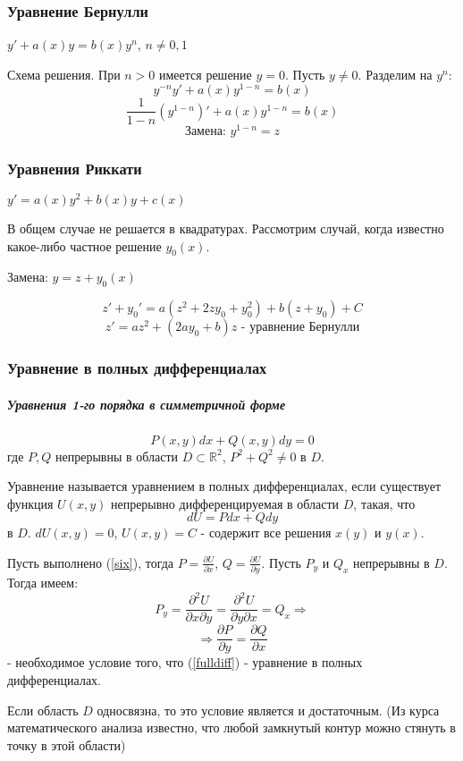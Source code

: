   \subsubsection{Уравнение Бернулли}
  $ \boxed{y' + a(x)y = b(x) y^n} $, $n \neq 0, 1 $
  
  \noindent Схема решения.  
  При $n > 0$ имеется решение $y = 0$.
  Пусть $y \neq 0$. Разделим на $y^n$:
  $$ y^{-n}y' + a(x)y^{1 - n} = b(x) $$
  $$ \frac{1}{1 - n}(y^{1-n})' + a(x)y^{1 - n} = b(x) $$
  $$ \text{Замена: } y^{1 -n} = z $$
  
  \subsubsection{Уравнения Риккати}
  $ \boxed{y' = a(x)y^2 + b(x) y + c(x)} $ 
  
  \noindent В общем случае не решается в квадратурах. Рассмотрим случай, когда известно какое-либо частное решение $y_0(x)$. 
  
  \noindent Замена: $y = z + y_0(x)$
  
  $$ z' + y_0' = a(z^2 + 2zy_0 + y_0^2) + b(z + y_0) + C $$
  $$ z' = az^2 + (2ay_0 + b)z \text{ - уравнение Бернулли} $$
  
  \subsubsection{Уравнение в полных дифференциалах}
  \subparagraph*{Уравнения 1-го порядка в симметричной форме}  
  \begin{equation} 
  \label{fulldiff}
  \boxed{P(x, y)dx + Q(x,y)dy = 0}
  \end{equation} 
  где $P, Q$ непрерывны в области $D \subset \mathbb{R}^2$, $P^2 + Q^2 \neq 0$ в $D$. 
  
  Уравнение называется уравнением в полных дифференциалах, если существует функция $U(x, y)$ непрерывно дифференцируемая в области $D$, такая, что 
  \begin{equation}
  \label{six}
  dU = Pdx + Qdy
  \end{equation} 
  в $D$. $dU(x,y) = 0$, $U(x, y) = C$ - содержит все решения $x(y)$ и $y(x)$.
  
  Пусть выполнено (\ref{six}), тогда $ P = \frac{\partial U}{\partial x} $, $ Q = \frac{\partial U}{\partial y} $.
  Пусть $P_y$ и $Q_x$ непрерывны в $D$. Тогда имеем:
  $$ P_y = \frac{\partial^2 U}{\partial x \partial y} = \frac{\partial^2 U}{\partial y \partial x} = Q_x \Rightarrow $$
  $$ \Rightarrow \frac{\partial P}{\partial y} = \frac{\partial Q}{\partial x} $$ 
   - необходимое условие того, что (\ref{fulldiff}) - уравнение в полных дифференциалах.
  
  \begin{ntc}
  Если область $D$ односвязна, то это условие является и достаточным. (Из курса математического анализа известно, что любой замкнутый контур можно стянуть в точку в этой области)
  \end{ntc}